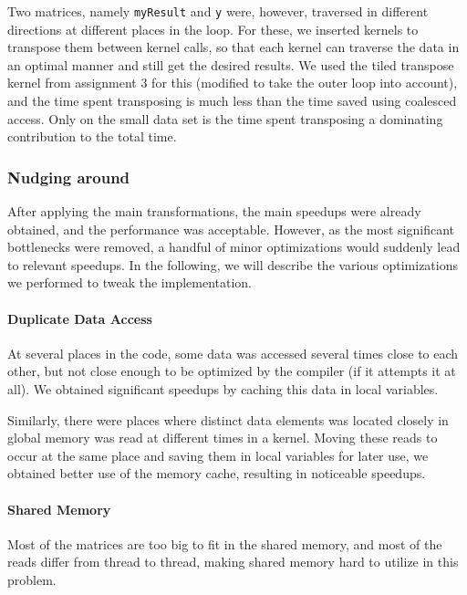 \documentclass[11pt]{article}
\begin{document}
Two matrices, namely \texttt{myResult} and \texttt{y} were, however, traversed in different directions at different places in the loop.
For these, we inserted kernels to transpose them between kernel calls, so that each kernel can traverse the data in an optimal manner and still get the desired results.
We used the tiled transpose kernel from assignment 3 for this (modified to take the outer loop into account), and the time spent transposing is much less than the time saved using coalesced access.
Only on the small data set is the time spent transposing a dominating contribution to the total time.


\subsubsection{Nudging around}

After applying the main transformations, the main speedups were already obtained, and the performance was acceptable.
However, as the most significant bottlenecks were removed, a handful of minor optimizations would suddenly lead to relevant speedups.
In the following, we will describe the various optimizations we performed to tweak the implementation.


\paragraph{Duplicate Data Access\\}
At several places in the code, some data was accessed several times close to each other, but not close enough to be optimized by the compiler (if it attempts it at all).
We obtained significant speedups by caching this data in local variables.

Similarly, there were places where distinct data elements was located closely in global memory was read at different times in a kernel.
Moving these reads to occur at the same place and saving them in local variables for later use, we obtained better use of the memory cache, resulting in noticeable speedups.

\paragraph{Shared Memory\\}
Most of the matrices are too big to fit in the shared memory, and most of the reads differ from thread to thread, making shared memory hard to utilize in this problem.
\end{document}
